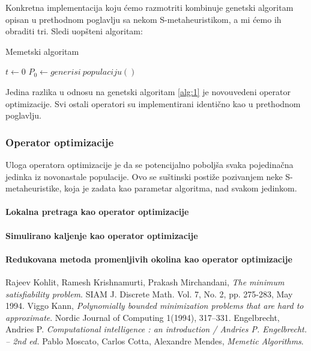 \documentclass[12pt, a4paper]{article}
\theoremstyle{definition}
\begin{document}
Konkretna implementacija koju ćemo razmotriti kombinuje genetski algoritam opisan u prethodnom poglavlju sa nekom S-metaheuristikom, a mi ćemo ih obraditi tri. Sledi uopšteni algoritam:

\begin{algorithm}
\caption{Memetski algoritam}
\label{alg:2}
$t \gets 0$\;
$P_0 \gets generisi\ populaciju()$\;
\end{algorithm}

Jedina razlika u odnosu na genetski algoritam \ref{alg:1} je novouvedeni operator optimizacije. Svi ostali operatori su implementirani identično kao u prethodnom poglavlju.

\subsubsection{Operator optimizacije}

Uloga operatora optimizacije je da se potencijalno poboljša svaka pojedinačna jedinka iz novonastale populacije. Ovo se suštinski postiže pozivanjem neke S-metaheuristike, koja je zadata kao parametar algoritma, nad svakom jedinkom.

\paragraph{Lokalna pretraga kao operator optimizacije}

\paragraph{Simulirano kaljenje kao operator optimizacije}

\paragraph{Redukovana metoda promenljivih okolina kao operator optimizacije}

\begin{thebibliography}{9}
Rajeev Kohlit, Ramesh Krishnamurti, Prakash Mirchandani, \emph{The minimum satisfiability problem}. SIAM J. Discrete Math. Vol. 7, No. 2, pp. 275-283, May 1994.
Viggo Kann, \emph{Polynomially bounded minimization problems that are hard to approximate}. Nordic Journal of Computing 1(1994), 317–331.
Engelbrecht, Andries P. \emph{Computational intelligence : an introduction / Andries P. Engelbrecht. – 2nd ed.}
Pablo Moscato, Carlos Cotta, Alexandre Mendes, \emph{Memetic Algorithms}. 
\end{thebibliography}
\end{document}
